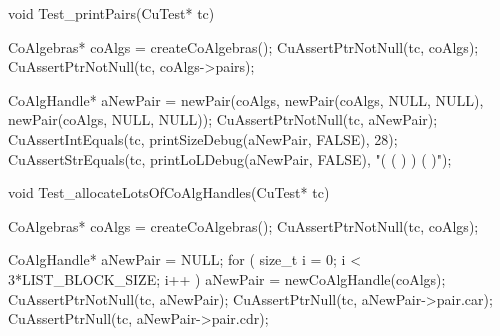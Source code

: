 void Test_printPairs(CuTest* tc) {
  CoAlgebras* coAlgs = createCoAlgebras();
  CuAssertPtrNotNull(tc, coAlgs);
  CuAssertPtrNotNull(tc, coAlgs->pairs);

  CoAlgHandle* aNewPair = newPair(coAlgs,
                               newPair(coAlgs, NULL, NULL),
                               newPair(coAlgs, NULL, NULL));
  CuAssertPtrNotNull(tc, aNewPair);
  CuAssertIntEquals(tc, printSizeDebug(aNewPair, FALSE), 28);
  CuAssertStrEquals(tc, printLoLDebug(aNewPair, FALSE), "( ( ) ) ( )");
}

void Test_allocateLotsOfCoAlgHandles(CuTest* tc) {
  CoAlgebras* coAlgs = createCoAlgebras();
  CuAssertPtrNotNull(tc, coAlgs);

  CoAlgHandle* aNewPair = NULL;
  for ( size_t i = 0; i < 3*LIST_BLOCK_SIZE; i++ ) {
    aNewPair = newCoAlgHandle(coAlgs);
  }
  CuAssertPtrNotNull(tc, aNewPair);
  CuAssertPtrNull(tc, aNewPair->pair.car);
  CuAssertPtrNull(tc, aNewPair->pair.cdr);
}

\stoptyping
